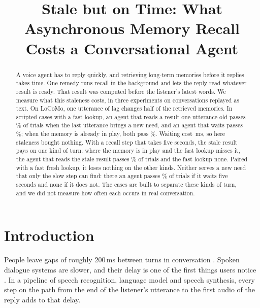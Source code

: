 \documentclass[10pt]{article}
\title{Stale but on Time: What Asynchronous Memory Recall\\Costs a Conversational Agent}
\author{\paperauthor}
\begin{document}
\maketitle

\begin{abstract}
A voice agent has to reply quickly, and retrieving long-term memories before it replies takes time. One remedy runs recall in the background and lets the reply read whatever result is ready. That result was computed before the listener's latest words. We measure what this staleness costs, in three experiments on conversations replayed as text. On LoCoMo, one utterance of lag changes half of the retrieved memories. In scripted cases with a fast lookup, an agent that reads a result one utterance old passes \RecLag\% of trials when the last utterance brings a new need, and an agent that waits passes \RecBlock\%; when the memory is already in play, both pass \CarryLag\%. Waiting cost \PreBlockMed\,ms, so here staleness bought nothing. With a recall step that takes five seconds, the stale result pays on one kind of turn: where the memory is in play and the fast lookup misses it, the agent that reads the stale result passes \SStaleC\% of trials and the fast lookup none. Paired with a fast fresh lookup, it loses nothing on the other kinds. Neither serves a new need that only the slow step can find: there an agent passes \SDeepD\% of trials if it waits five seconds and none if it does not. The cases are built to separate these kinds of turn, and we did not measure how often each occurs in real conversation.
\end{abstract}

\begingroup
\renewcommand\thefootnote{}
\addtocounter{footnote}{-1}
\endgroup

\section{Introduction}

People leave gaps of roughly 200\,ms between turns in conversation \citep{stivers2009universals,levinson2015timing}. Spoken dialogue systems are slower, and their delay is one of the first things users notice \citep{skantze2021turn}. In a pipeline of speech recognition, language model and speech synthesis, every step on the path from the end of the listener's utterance to the first audio of the reply adds to that delay.
\end{document}
